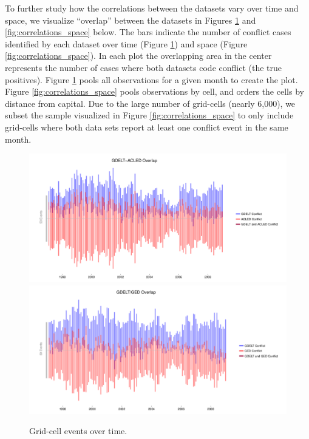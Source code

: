 \documentclass[hidelinks]{article}
\begin{document}
To further study how the correlations between the datasets vary over time and space, we visualize ``overlap'' between the datasets in Figures \ref{fig:correlations_time} and \ref{fig:correlations_space} below. The bars indicate the number of conflict cases identified by each dataset over time (Figure \ref{fig:correlations_time}) and space (Figure \ref{fig:correlations_space}). In each plot the overlapping area in the center represents the number of cases where both datasets code conflict (the true positives). Figure \ref{fig:correlations_time} pools all observations for a given month to create the plot. Figure \ref{fig:correlations_space} pools observations by cell, and orders the cells by distance from capital. Due to the large number of grid-cells (nearly 6,000), we subset the sample visualized in Figure \ref{fig:correlations_space} to only include grid-cells where both data sets report at least one conflict event in the same month.

\begin{figure}[!htbp]
\includegraphics[width = 1 \textwidth]{timeACLED.pdf}\\
\includegraphics[width = 1 \textwidth]{timeGED.pdf}
\caption{Grid-cell events over time.}\label{fig:correlations_time}
\end{figure}
\end{document}
